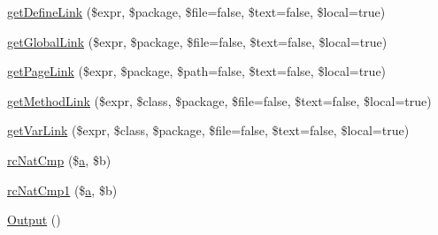 \begin{DoxyCompactItemize}
\item 
\hyperlink{class_x_m_l_doc_book_converter_aa5c57990ec6adfbcae5fcc7bc306f615}{get\-Define\-Link} (\$expr, \$package, \$file=false, \$text=false, \$local=true)
\item 
\hyperlink{class_x_m_l_doc_book_converter_a33bb7dbf96c53bd3023b3c1202f71aaf}{get\-Global\-Link} (\$expr, \$package, \$file=false, \$text=false, \$local=true)
\item 
\hyperlink{class_x_m_l_doc_book_converter_a3cbc4d05d935c1cc162d401cf9351592}{get\-Page\-Link} (\$expr, \$package, \$path=false, \$text=false, \$local=true)
\item 
\hyperlink{class_x_m_l_doc_book_converter_afad45ed8b83eebbcd771bf9670eb6f24}{get\-Method\-Link} (\$expr, \$class, \$package, \$file=false, \$text=false, \$local=true)
\item 
\hyperlink{class_x_m_l_doc_book_converter_ab17ce6d4f7e64064435e6cd67b7f7bad}{get\-Var\-Link} (\$expr, \$class, \$package, \$file=false, \$text=false, \$local=true)
\item 
\hyperlink{class_x_m_l_doc_book_converter_a669301a557a996bf338badc5ca253156}{rc\-Nat\-Cmp} (\$\hyperlink{classa}{a}, \$b)
\item 
\hyperlink{class_x_m_l_doc_book_converter_ac75bdbfec92cd3025b5bdb5f60e14970}{rc\-Nat\-Cmp1} (\$\hyperlink{classa}{a}, \$b)
\item 
\hyperlink{class_x_m_l_doc_book_converter_a356172c336fe8c0afbac8c49d5dcc703}{\-Output} ()
\end{DoxyCompactItemize}
